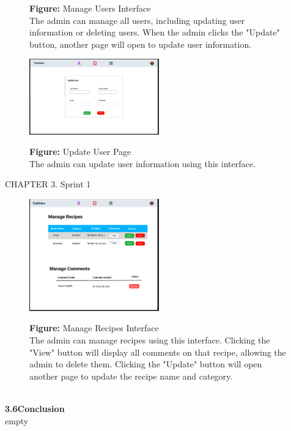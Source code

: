 \documentclass{article}
\begin{document}
{{{{{{{{\begin{figure}[htbp]
    \textbf{Figure:} Manage Users Interface \\
    The admin can manage all users, including updating user information or deleting users. When the admin clicks the "Update" button, another page will open to update user information.
\end{figure}

\begin{figure}[htbp]
    \centering
    \includegraphics[width=0.5\textwidth]{UpdateUser} 
    \vspace{0.5cm}
    
    \textbf{Figure:} Update User Page \\
    The admin can update user information using this interface.
\end{figure}
\newpage
\noindent
CHAPTER 3.  Sprint 1 \\
\underline{\hspace{\textwidth}} \vspace{0.2cm}
\begin{figure}[htbp]
    \centering
    \includegraphics[width=0.5\textwidth]{ManageRecipes} 
    \vspace{0.5cm}
    
    \textbf{Figure:} Manage Recipes Interface \\
    The admin can manage recipes using this interface. Clicking the "View" button will display all comments on that recipe, allowing the admin to delete them. Clicking the "Update" button will open another page to update the recipe name and category.
\end{figure}\\
{\Large \textbf{3.6\hspace{1em}Conclusion}}\vspace{0.2cm}\\
empty
\newpage
}}}}}}}}
\end{document}
